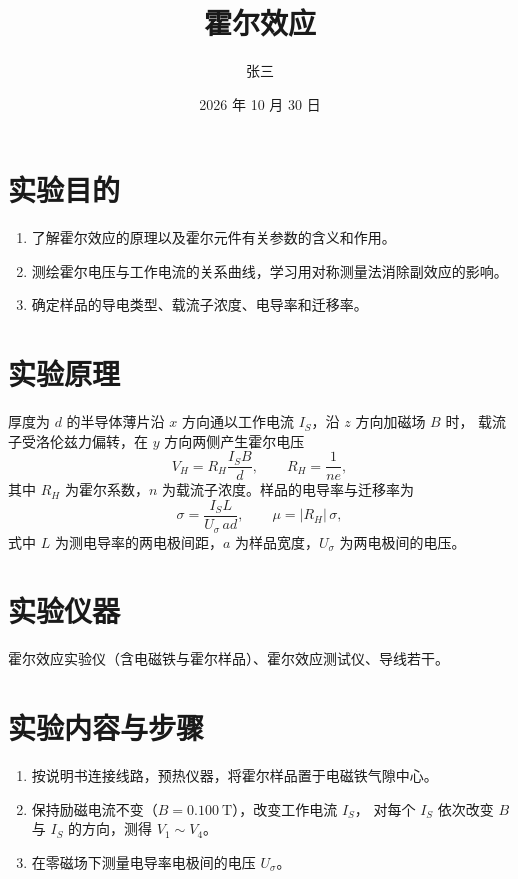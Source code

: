 \documentclass[boxed]{physlab}
\title{霍尔效应}
\author{张三}
\date{2026 年 10 月 30 日}
\begin{document}
\maketitle

\section{实验目的}
\begin{enumerate}
  \item 了解霍尔效应的原理以及霍尔元件有关参数的含义和作用。
  \item 测绘霍尔电压与工作电流的关系曲线，学习用对称测量法消除副效应的影响。
  \item 确定样品的导电类型、载流子浓度、电导率和迁移率。
\end{enumerate}

\section{实验原理}
厚度为 $d$ 的半导体薄片沿 $x$ 方向通以工作电流 $I_S$，沿 $z$ 方向加磁场 $B$ 时，
载流子受洛伦兹力偏转，在 $y$ 方向两侧产生霍尔电压
\begin{equation}
  \label{eq:hall}
  V_H = R_H \frac{I_S B}{d}, \qquad R_H = \frac{1}{ne},
\end{equation}
其中 $R_H$ 为霍尔系数，$n$ 为载流子浓度。样品的电导率与迁移率为
\begin{equation}
  \label{eq:sigma}
  \sigma = \frac{I_S L}{U_\sigma\, a d}, \qquad \mu = \lvert R_H \rvert\, \sigma ,
\end{equation}
式中 $L$ 为测电导率的两电极间距，$a$ 为样品宽度，$U_\sigma$ 为两电极间的电压。

\section{实验仪器}
霍尔效应实验仪（含电磁铁与霍尔样品）、霍尔效应测试仪、导线若干。

\section{实验内容与步骤}
\begin{enumerate}
  \item 按说明书连接线路，预热仪器，将霍尔样品置于电磁铁气隙中心。
  \item 保持励磁电流不变（$B = \qty{0.100}{\tesla}$），改变工作电流 $I_S$，
        对每个 $I_S$ 依次改变 $B$ 与 $I_S$ 的方向，测得 $V_1 \sim V_4$。
  \item 在零磁场下测量电导率电极间的电压 $U_\sigma$。
\end{enumerate}
\end{document}
